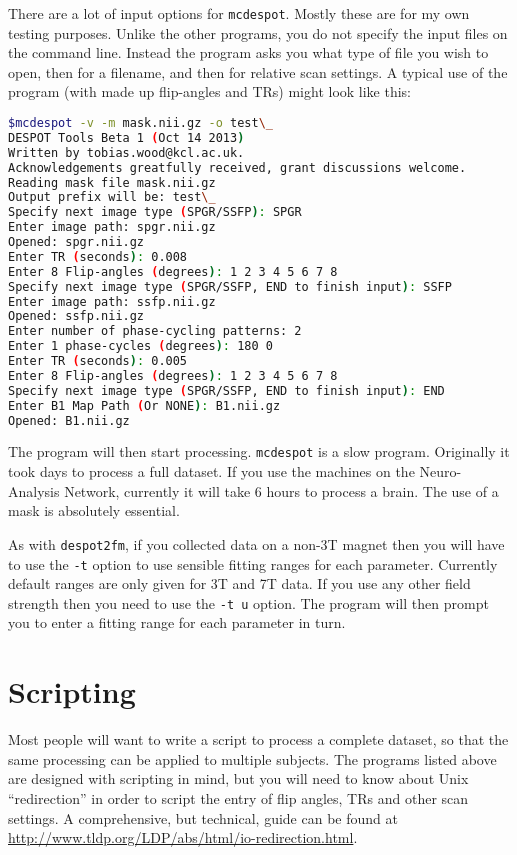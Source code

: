 \documentclass{report}
\begin{document}
There are a lot of input options for \texttt{mcdespot}. Mostly these are for my own testing purposes. Unlike the other programs, you do not specify the input files on the command line. Instead the program asks you what type of file you wish to open, then for a filename, and then for relative scan settings. A typical use of the program (with made up flip-angles and TRs) might look like this:

\begin{lstlisting}[language=sh]
$mcdespot -v -m mask.nii.gz -o test\_
DESPOT Tools Beta 1 (Oct 14 2013)
Written by tobias.wood@kcl.ac.uk. 
Acknowledgements greatfully received, grant discussions welcome.
Reading mask file mask.nii.gz
Output prefix will be: test\_
Specify next image type (SPGR/SSFP): SPGR
Enter image path: spgr.nii.gz
Opened: spgr.nii.gz
Enter TR (seconds): 0.008
Enter 8 Flip-angles (degrees): 1 2 3 4 5 6 7 8
Specify next image type (SPGR/SSFP, END to finish input): SSFP
Enter image path: ssfp.nii.gz
Opened: ssfp.nii.gz
Enter number of phase-cycling patterns: 2
Enter 1 phase-cycles (degrees): 180 0
Enter TR (seconds): 0.005
Enter 8 Flip-angles (degrees): 1 2 3 4 5 6 7 8
Specify next image type (SPGR/SSFP, END to finish input): END
Enter B1 Map Path (Or NONE): B1.nii.gz
Opened: B1.nii.gz
\end{lstlisting}

The program will then start processing. \texttt{mcdespot} is a slow program. Originally it took days to process a full dataset. If you use the machines on the Neuro-Analysis Network, currently it will take 6 hours to process a brain. The use of a mask is absolutely essential.

As with \texttt{despot2fm}, if you collected data on a non-3T magnet then you will have to use the \texttt{-t} option to use sensible fitting ranges for each parameter. Currently default ranges are only given for 3T and 7T data. If you use any other field strength then you need to use the \texttt{-t u} option. The program will then prompt you to enter a fitting range for each parameter in turn.

\section{Scripting}\label{scripting}

Most people will want to write a script to process a complete dataset, so that the same processing can be applied to multiple subjects. The programs listed above are designed with scripting in mind, but you will need to know about Unix ``redirection'' in order to script the entry of flip angles, TRs and other scan settings. A comprehensive, but technical, guide can be found at \url{http://www.tldp.org/LDP/abs/html/io-redirection.html}.
\end{document}
